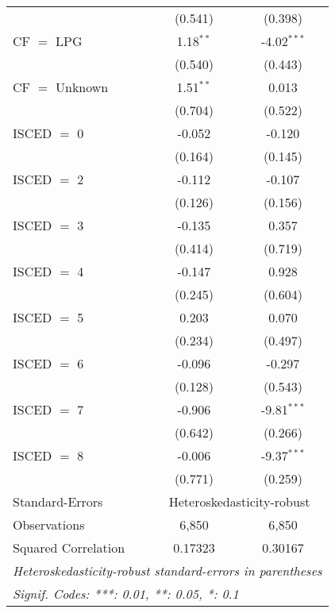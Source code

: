 \begin{table}[htbp!]
\begin{adjustbox}{width = 1\textwidth, max height = 0.95\textheight, center}
\begin{threeparttable}[b]
\begin{tabular}{lcc}
                                 & (0.541)        & (0.398)\\   
            CF $=$ LPG           & 1.18$^{**}$    & -4.02$^{***}$\\   
                                 & (0.540)        & (0.443)\\   
            CF $=$ Unknown       & 1.51$^{**}$    & 0.013\\   
                                 & (0.704)        & (0.522)\\   
            ISCED $=$ 0          & -0.052         & -0.120\\   
                                 & (0.164)        & (0.145)\\   
            ISCED $=$ 2          & -0.112         & -0.107\\   
                                 & (0.126)        & (0.156)\\   
            ISCED $=$ 3          & -0.135         & 0.357\\   
                                 & (0.414)        & (0.719)\\   
            ISCED $=$ 4          & -0.147         & 0.928\\   
                                 & (0.245)        & (0.604)\\   
            ISCED $=$ 5          & 0.203          & 0.070\\   
                                 & (0.234)        & (0.497)\\   
            ISCED $=$ 6          & -0.096         & -0.297\\   
                                 & (0.128)        & (0.543)\\   
            ISCED $=$ 7          & -0.906         & -9.81$^{***}$\\   
                                 & (0.642)        & (0.266)\\   
            ISCED $=$ 8          & -0.006         & -9.37$^{***}$\\   
                                 & (0.771)        & (0.259)\\   
            \midrule 
            Standard-Errors & \multicolumn{2}{c}{Heteroskedasticity-robust} \\ 
            Observations         & 6,850          & 6,850\\  
            Squared Correlation  & 0.17323        & 0.30167\\  
            \midrule \midrule
            \multicolumn{3}{l}{\emph{Heteroskedasticity-robust standard-errors in parentheses}}\\
            \multicolumn{3}{l}{\emph{Signif. Codes: ***: 0.01, **: 0.05, *: 0.1}}\\
         \end{tabular}
         

\end{threeparttable}
\end{adjustbox}
\end{table}
